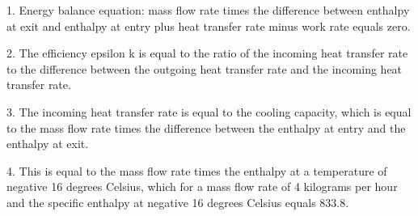 1. Energy balance equation: mass flow rate times the difference between enthalpy at exit and enthalpy at entry plus heat transfer rate minus work rate equals zero.

2. The efficiency epsilon k is equal to the ratio of the incoming heat transfer rate to the difference between the outgoing heat transfer rate and the incoming heat transfer rate.

3. The incoming heat transfer rate is equal to the cooling capacity, which is equal to the mass flow rate times the difference between the enthalpy at entry and the enthalpy at exit.

4. This is equal to the mass flow rate times the enthalpy at a temperature of negative 16 degrees Celsius, which for a mass flow rate of 4 kilograms per hour and the specific enthalpy at negative 16 degrees Celsius equals 833.8.